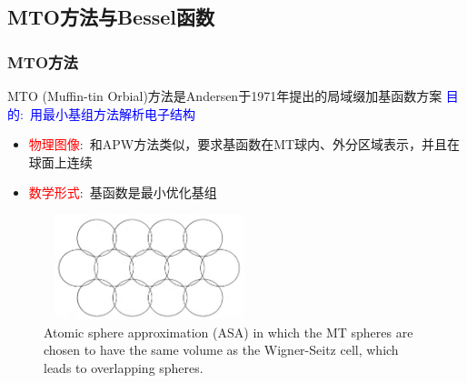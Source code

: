 \subsection{\rm{MTO}方法与\rm{Bessel}函数}
\frame
{
\frametitle{\textrm{MTO}方法}
\textrm{MTO (Muffin-tin Orbial)}方法是\textrm{Andersen}于\textrm{1971}年提出的局域缀加基函数方案
\vskip 5pt
\textcolor{blue}{目的:~用最小基组方法解析电子结构}
\begin{itemize}
	\item \textcolor{red}{物理图像}:~和\textrm{APW}方法类似，要求基函数在\textrm{MT}球内、外分区域表示，并且在球面上连续
	\item \textcolor{red}{数学形式}:~基函数是最小优化基组
\end{itemize}
\begin{figure}[h!]
	\vspace{-5pt}
\centering
\includegraphics[height=1.20in,width=2.42in,viewport=5 0 1005 495,clip]{Figures/Atomic_sphere-appro.png}
\caption{\fontsize{6.2pt}{4.2pt}\selectfont\textrm{Atomic sphere approximation (ASA) in which the MT spheres are chosen to have the same volume as the Wigner-Seitz cell, which leads to overlapping spheres.}}
\label{Atomic_sphere-appro}
\end{figure}
}

